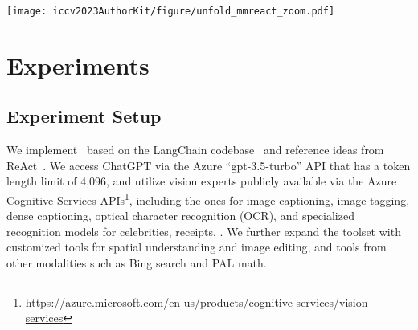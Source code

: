 \begin{figure*}[t]
\centering
\vspace{-10mm}
\texttt{[image: iccv2023AuthorKit/figure/unfold\_mmreact\_zoom.pdf]}
\vspace{-1ex}
\caption{An example of \modelname's full execution flow. The blue circles with numbered indices indicate the order in which different models are called (\ie, the executions). The executions, highlighted by bold underlined text, can be either a ChatGPT call (\eg, ``\textbf{\underline{ChatGPT:}}'') or running one or multiple selected vision experts (\eg, ``\textbf{\underline{Image Captioning}}''). We add a commentary text \textit{action execution} in dashed boxes to help understand the expert execution. Each ChatGPT execution takes the preceding text as input and generates the text leading up to the next execution (\eg, \textit{``This is an image. Assistant, what $\ldots$ image? \textless ImagePath\textgreater''} for Execution~1).
Texts in gray represent \modelname's thoughts or vision experts' actions and outputs, which are invisible to users. This multimodal reasoning and action process occurs behind the scene to gather the necessary information for generating final responses to users, which are shown in black.
	}
\label{fig:prompt}
\end{figure*}

\section{Experiments}
\subsection{Experiment Setup}
We implement \modelname~based on the LangChain codebase~\cite{langchain} and reference ideas from ReAct~\cite{yao2022react}. We access ChatGPT via the Azure ``gpt-3.5-turbo'' API that has a token length limit of 4,096, and utilize vision experts publicly available via the Azure Cognitive Services APIs\footnote{\url{https://azure.microsoft.com/en-us/products/cognitive-services/vision-services}}, including the ones for image captioning,
image tagging, dense captioning, optical character recognition (OCR), and specialized recognition models for celebrities, receipts, \etc. We further expand the toolset with customized tools for spatial understanding and image editing, and tools from other modalities such as Bing search and PAL math.

